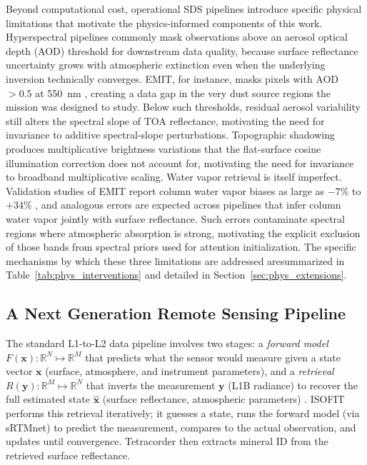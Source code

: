 \documentclass[preprint,12pt]{elsarticle}
\newcommand{\R}{\mathbb{R}}
\begin{document}
Beyond computational cost, operational SDS pipelines introduce specific physical limitations that motivate the physics-informed components of this work. 
Hyperspectral pipelines commonly mask observations above an aerosol optical depth (AOD) threshold for downstream data quality, because surface reflectance uncertainty grows with atmospheric extinction even when the underlying inversion technically converges.
EMIT, for instance, masks pixels with AOD~$> 0.5$ at 550~nm \cite{emit_l2a_atbd, emit_l3_atbd}, creating a data gap in the very dust source regions the mission was designed to study. 
Below such thresholds, residual aerosol variability still alters the spectral slope of TOA reflectance, motivating the need for invariance to additive spectral-slope perturbations. 
Topographic shadowing produces multiplicative brightness variations that the flat-surface cosine illumination correction does not account for, motivating the need for invariance to broadband multiplicative scaling.
Water vapor retrieval is itself imperfect. 
Validation studies of EMIT report column water vapor biases as large as $-7\%$ to $+34\%$ \cite{thompson_emit_2024}, and analogous errors are expected across pipelines that infer column water vapor jointly with surface reflectance.  
Such errors contaminate spectral regions where atmospheric absorption is strong, motivating the explicit exclusion of those bands from spectral priors used for attention initialization. 
The specific mechanisms by which these three limitations are addressed aresummarized in Table~\ref{tab:phys_interventions} and detailed in Section~\ref{sec:phys_extensions}.


\subsection{A Next Generation Remote Sensing Pipeline}
\label{sec:rtm_bypass}

The standard L1-to-L2 data pipeline involves two stages: a \emph{forward model} $F(\mathbf{x}): \R^N \mapsto \R^M$ that predicts what the sensor would measure given a state vector $\mathbf{x}$ (surface, atmosphere, and instrument parameters), and a \emph{retrieval} $R(\mathbf{y}): \R^M \mapsto \R^N$ that inverts the measurement $\mathbf{y}$ (L1B radiance) to recover the full estimated state $\hat{\mathbf{x}}$ (surface reflectance, atmospheric parameters) \cite{thompson2018}. 
ISOFIT performs this retrieval iteratively; it guesses a state, runs the forward model (via sRTMnet) to predict the measurement, compares to the actual observation, and updates until convergence. 
Tetracorder then extracts mineral ID from the retrieved surface reflectance.
\end{document}
